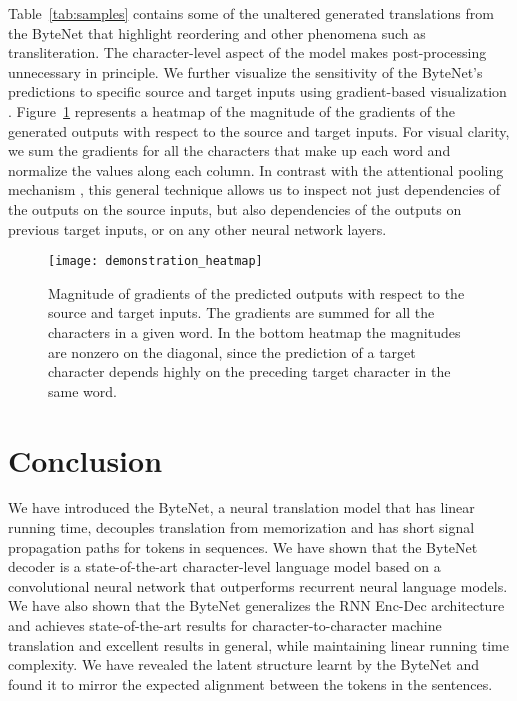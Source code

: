 \documentclass{article}
\begin{document}
Table~\ref{tab:samples} contains some of the unaltered generated translations from the ByteNet that highlight reordering and other phenomena such as transliteration. The character-level aspect of the model makes post-processing unnecessary in principle. We further visualize the sensitivity of the ByteNet's predictions to specific source and target inputs using gradient-based visualization \citep{DBLP:journals/corr/SimonyanVZ13}. Figure~\ref{fig:gradheatmaps} represents a heatmap of the magnitude of the gradients of the generated outputs with respect to the source and target inputs. For visual clarity, we sum the gradients for all the characters that make up each word and normalize the values along each column. In contrast with the attentional pooling mechanism \citep{DBLP:journals/corr/BahdanauCB14}, this general technique allows us to inspect not just dependencies of the outputs on the source inputs, but also dependencies of the outputs on previous target inputs, or on any other neural network layers.

\begin{figure}
\centering
\texttt{[image: demonstration\_heatmap]}
\vspace{-0.9cm}
\caption{Magnitude of gradients of the predicted outputs with respect to the source and target inputs. The gradients are summed for all the characters in a given word. In the bottom heatmap the magnitudes are nonzero on the diagonal, since the prediction of a target character depends highly on the  preceding target character in the same word.}
\label{fig:gradheatmaps}
\end{figure}

\section{Conclusion}

We have introduced the ByteNet, a neural translation model that has linear running time, decouples translation from memorization and has short signal propagation paths for tokens in sequences. We have shown that the ByteNet decoder is a state-of-the-art character-level language model based on a convolutional neural network that outperforms recurrent neural language models. We have also shown that the ByteNet generalizes the RNN Enc-Dec architecture and achieves state-of-the-art results for character-to-character machine translation and excellent results in general, while maintaining linear running time complexity. We have revealed the latent structure learnt by the ByteNet and found it to mirror the expected alignment between the tokens in the sentences. 






\end{document}
